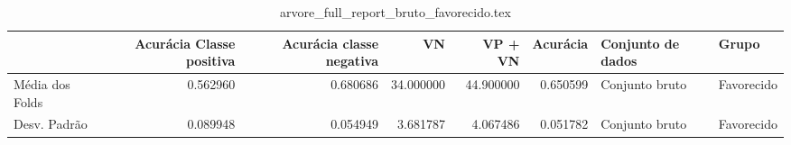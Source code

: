 \begin{table}
\centering
\caption{arvore_full_report_bruto_favorecido.tex}
\label{arvore_full_report_bruto_favorecido.tex}
\begin{tabular}{lrrrrrll}
\toprule
{} &  Acurácia Classe positiva &  Acurácia classe negativa &        VN  &   VP + VN  &  Acurácia & Conjunto de dados &       Grupo \\
\midrule
Média dos Folds &                  0.562960 &                  0.680686 &  34.000000 &  44.900000 &  0.650599 &    Conjunto bruto &  Favorecido \\
Desv. Padrão    &                  0.089948 &                  0.054949 &   3.681787 &   4.067486 &  0.051782 &    Conjunto bruto &  Favorecido \\
\bottomrule
\end{tabular}
\end{table}

